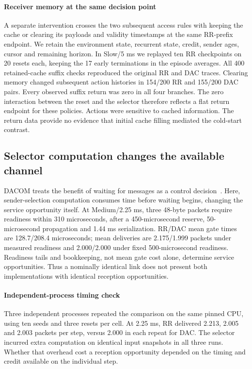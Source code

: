 \documentclass[a4paper,fleqn]{cas-dc}
\begin{document}
\paragraph{Receiver memory at the same decision point}
A separate intervention crosses the two subsequent access rules with keeping the cache or clearing its payloads and validity timestamps at the same RR-prefix endpoint. We retain the environment state, recurrent state, credit, sender ages, cursor and remaining horizon. In Slow/5 ms we replayed ten RR checkpoints on 20 resets each, keeping the 17 early terminations in the episode averages. All 400 retained-cache suffix checks reproduced the original RR and DAC traces. Clearing memory changed subsequent action histories in 154/200 RR and 155/200 DAC pairs. Every observed suffix return was zero in all four branches. The zero interaction between the reset and the selector therefore reflects a flat return endpoint for these policies. Actions were sensitive to cached information. The return data provide no evidence that initial cache filling mediated the cold-start contrast.
\subsection{Selector computation changes the available channel}
DACOM treats the benefit of waiting for messages as a control decision~\citep{yuan2023dacom}. Here, sender-selection computation consumes time before waiting begins, changing the service opportunity itself. At Medium/2.25 ms, three 48-byte packets require readiness within 310 microseconds, after a 450-microsecond reserve, 50-microsecond propagation and 1.44 ms serialization. RR/DAC mean gate times are 128.7/208.4 microseconds; mean deliveries are 2.175/1.999 packets under measured readiness and 2.000/2.000 under fixed 500-microsecond readiness. Readiness tails and bookkeeping, not mean gate cost alone, determine service opportunities. Thus a nominally identical link does not present both implementations with identical reception opportunities.

\paragraph{Independent-process timing check}
Three independent processes repeated the comparison on the same pinned CPU, using ten seeds and three resets per cell. At 2.25 ms, RR delivered 2.213, 2.005 and 2.003 packets per step, versus 2.000 in each repeat for DAC. The selector incurred extra computation on identical input snapshots in all three runs. Whether that overhead cost a reception opportunity depended on the timing and credit available on the individual step.
\end{document}
